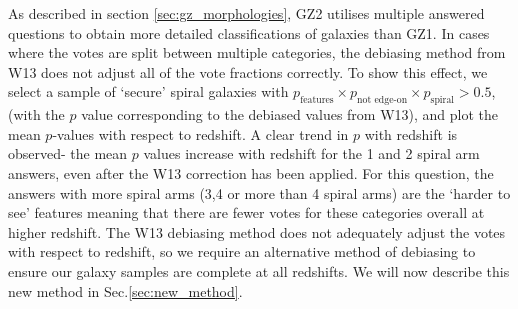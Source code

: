\documentclass[useAMS,usenatbib]{mn2e}
\begin{document}
As described in section \ref{sec:gz_morphologies}, GZ2 utilises multiple answered questions to obtain more detailed classifications of galaxies than GZ1. In cases where the votes are split between multiple categories, the debiasing method from W13 does not adjust all of the vote fractions correctly. To show this effect, we select a sample of `secure' spiral galaxies with $p_{\textrm{features}} \times p_{\textrm{not edge-on}} \times p_{\textrm{spiral}} > 0.5$, (with the $p$ value corresponding to the debiased values from W13), and plot the mean $p$-values with respect to redshift. A clear trend in $p$ with redshift is observed- the mean $p$ values increase with redshift for the 1 and 2 spiral arm answers, even after the W13 correction has been applied. For this question, the answers with more spiral arms (3,4 or more than 4 spiral arms) are the `harder to see' features meaning that there are fewer votes for these categories overall at higher redshift. The W13 debiasing method does not adequately adjust the votes with respect to redshift, so we require an alternative method of debiasing to ensure our galaxy samples are complete at all redshifts. We will now describe this new method in Sec.\ref{sec:new_method}.
\end{document}
